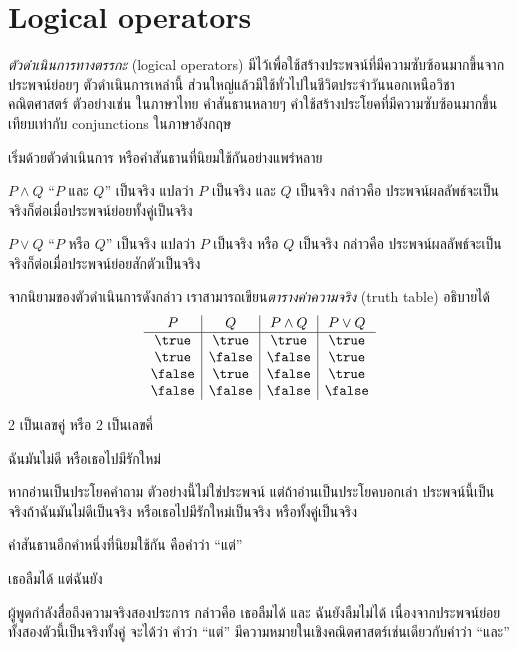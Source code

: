 \section{Logical operators}

\emph{ตัวดำเนินการทางตรรกะ} (logical operators) มีไว้เพื่อใช้สร้างประพจน์ที่มีความซับซ้อนมากขึ้นจากประพจน์ย่อยๆ ตัวดำเนินการเหล่านี้ ส่วนใหญ่แล้วมีใช้ทั่วไปในชีวิตประจำวันนอกเหนือวิชาคณิตศาสตร์ ตัวอย่างเช่น ในภาษาไทย คำสันธานหลายๆ คำใช้สร้างประโยคที่มีความซับซ้อนมากขึ้น เทียบเท่ากับ conjunctions ในภาษาอังกฤษ

เริ่มด้วยตัวดำเนินการ หรือคำสันธานที่นิยมใช้กันอย่างแพร่หลาย
\begin{definition}[and]
    $P\wedge Q$ ``$P$ และ $Q$'' เป็นจริง แปลว่า $P$ เป็นจริง และ $Q$ เป็นจริง กล่าวคือ ประพจน์ผลลัพธ์จะเป็นจริงก็ต่อเมื่อประพจน์ย่อยทั้งคู่เป็นจริง
\end{definition}
\begin{definition}[or]
    $P\vee Q$ ``$P$ หรือ $Q$'' เป็นจริง แปลว่า $P$ เป็นจริง หรือ $Q$ เป็นจริง กล่าวคือ ประพจน์ผลลัพธ์จะเป็นจริงก็ต่อเมื่อประพจน์ย่อยสักตัวเป็นจริง
\end{definition}
จากนิยามของตัวดำเนินการดังกล่าว เราสามารถเขียน\emph{ตารางค่าความจริง} (truth table) อธิบายได้
\[
\begin{array}{c|c|c|c}
P & Q & P\wedge Q & P\vee Q \\\hline
\true & \true & \true & \true \\
\true & \false & \false & \true \\
\false & \true & \false & \true \\
\false & \false & \false & \false
\end{array}
\]

\begin{example}
2 เป็นเลขคู่ หรือ 2 เป็นเลขคี่
\end{example}

\begin{example}
ฉันมันไม่ดี หรือเธอไปมีรักใหม่

หากอ่านเป็นประโยคคำถาม ตัวอย่างนี้ไม่ใช่ประพจน์ แต่ถ้าอ่านเป็นประโยคบอกเล่า ประพจน์นี้เป็นจริงถ้าฉันมันไม่ดีเป็นจริง หรือเธอไปมีรักใหม่เป็นจริง หรือทั้งคู่เป็นจริง
\end{example}

คำสันธานอีกคำหนึ่งที่นิยมใช้กัน คือคำว่า ``แต่''
\begin{example}
เธอลืมได้ แต่ฉันยัง

ผู้พูดกำลังสื่อถึงความจริงสองประการ กล่าวคือ เธอลืมได้ และ ฉันยังลืมไม่ได้ \enskip เนื่องจากประพจน์ย่อยทั้งสองตัวนี้เป็นจริงทั้งคู่ จะได้ว่า คำว่า ``แต่'' มีความหมายในเชิงคณิตศาสตร์เช่นเดียวกับคำว่า ``และ''
\end{example}

